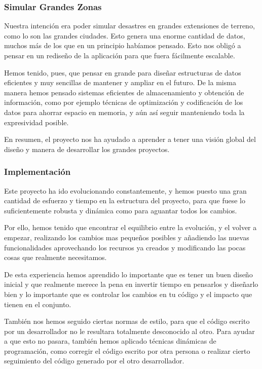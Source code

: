 \subsubsection*{Simular Grandes Zonas}

Nuestra intención era poder simular desastres en grandes extensiones de terreno,
como lo son las grandes ciudades. Esto genera una enorme cantidad de datos,
muchos más de los que en un principio habíamos pensado. Esto nos obligó a
pensar en un rediseño de la aplicación para que fuera fácilmente escalable.

Hemos tenido, pues, que pensar en grande para diseñar estructuras de datos
eficientes y muy sencillas de mantener y ampliar en el futuro. De la misma
manera hemos pensado sistemas eficientes de almacenamiento y obtención de
información, como por ejemplo técnicas de optimización y codificación de los
datos para ahorrar espacio en memoria, y aún así seguir manteniendo toda la
expresividad posible.

En resumen, el proyecto nos ha ayudado a aprender a tener una visión global del
diseño y manera de desarrollar los grandes proyectos.

\subsubsection*{Implementación}

Este proyecto ha ido evolucionando constantemente, y hemos puesto una gran
cantidad de esfuerzo y tiempo en la estructura del proyecto, para que fuese lo
suficientemente robusta y dinámica como para aguantar todos los cambios.

Por ello, hemos tenido que encontrar el equilibrio entre la evolución, y el
volver a empezar, realizando los cambios mas pequeños posibles y añadiendo las
nuevas funcionalidades aprovechando los recursos ya creados y modificando las
pocas cosas que realmente necesitamos.

De esta experiencia hemos aprendido lo importante que es tener un buen diseño
inicial y que realmente merece la pena en invertir tiempo en pensarlos y
diseñarlo bien y lo importante que es controlar los cambios en tu código y el
impacto que tienen en el conjunto.

También nos hemos seguido ciertas normas de estilo, para que 
el código escrito por un desarrollador no le resultara totalmente desconocido
al otro. Para ayudar a que esto no pasara, también hemos aplicado técnicas
dinámicas de programación, como corregir el código escrito por otra persona o
realizar cierto seguimiento del código generado por el otro desarrollador.


